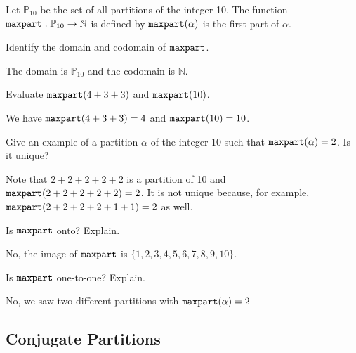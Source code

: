 \begin{exam}
\label{exam_max_part_fn_partitions}
    Let $\mathbb{P}_{10}$ be the set of all partitions of the integer 10. The function $\texttt{maxpart}:\mathbb{P}_{10} \to \mathbb{N}$ is defined by $\texttt{maxpart}(\alpha)$ is the first part of $\alpha$.
        \begin{apart}
            \item Identify the domain and codomain  of $\texttt{maxpart}$.
                \begin{soln}
                    The domain is $\mathbb{P}_{10}$ and the codomain is $\mathbb{N}$.
                \end{soln}
            \item Evaluate $\texttt{maxpart}(4+3+3)$ and $\texttt{maxpart}(10)$.
                \begin{soln}
                    We have $\texttt{maxpart}(4+3+3)=4$ and $\texttt{maxpart}(10)=10$.
                \end{soln}
            \item Give an example of a partition $\alpha$ of the integer 10 such that  $\texttt{maxpart}(\alpha)=2$. Is it unique?
                \begin{soln}
                    Note that $ 2+2+2+2+2$ is a partition of 10 and $\texttt{maxpart}(2+2+2+2+2)=2$.  It is not unique because, for example, $\texttt{maxpart}(2+2+2+2+1+1)=2$ as well.
                \end{soln}
            \item Is $\texttt{maxpart}$ onto? Explain.
                \begin{soln}
                    No, the image of $\texttt{maxpart}$ is $\{1,2,3,4,5,6,7,8,9,10\}$.
                \end{soln}
            \item Is $\texttt{maxpart}$ one-to-one? Explain.
                \begin{soln}
                    No, we saw two different partitions with $\texttt{maxpart}(\alpha)=2$
                \end{soln}
        \end{apart}
\end{exam}


\newcommand{\subselfconj}{Conjugate Partitions}
\subsection{\subselfconj}
\label{sub_selfconjugate_partitions}

